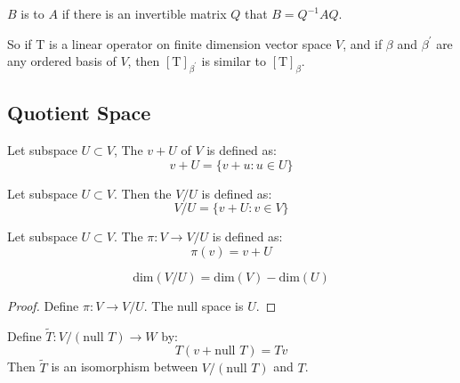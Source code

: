 \begin{definition}
	$B$ is  to $A$ if there is an invertible matrix $Q$ that $B = Q^{-1} A Q$.
\end{definition}

So if $\mathrm{T}$ is a linear operator on finite dimension vector space $V$, and if $\beta$ and $\beta^\prime$ are any ordered basis of $V$, then $[\mathrm{T}]_{\beta^\prime}$ is similar to $[\mathrm{T}]_\beta$.



\subsection{Quotient Space}

\begin{definition}
    Let subspace $U \subset V$, The   $v + U$ of $V$ is defined as:
    \begin{equation}
        v + U = \{ v + u: u \in U\}
    \end{equation}    
\end{definition}

\begin{definition}
    Let subspace $U \subset V$. Then the  $V/U$ is defined as:
    \begin{equation}
        V/U = \{ v + U: v \in V \}
    \end{equation}
\end{definition}

\begin{definition}
    Let subspace $U \subset V$. The  $\pi: V \rightarrow V/U$ is defined as:
    \begin{equation}
        \pi(v) = v + U
    \end{equation}
\end{definition}

\begin{theorem}
    \begin{equation}
        \text{dim}(V/U) = \text{dim}(V) - \text{dim}(U)
    \end{equation}
\end{theorem}

\begin{proof}
    Define $\pi : V \rightarrow V/U$. The null space is $U$.
\end{proof}

\begin{theorem}
    Define $\tilde{T}: V/(\text{null } T) \rightarrow W$ by:
    \begin{equation*}
        T(v + \text{null } T) = Tv
    \end{equation*}
    Then $\tilde{T}$ is an isomorphism between $V/(\text{null } T)$ and $T$.
\end{theorem}



